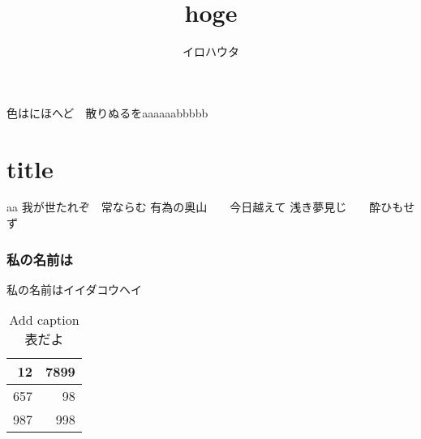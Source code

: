 \documentclass{ujarticle}
\title{hoge}
\author{イロハウタ}
\begin{document}
\maketitle

色はにほへど　散りぬるをaaaaaabbbbb\part{title}aa
我が世たれぞ　常ならむ
有為の奥山　　今日越えて
浅き夢見じ　　酔ひもせず

\newpage
\section{私の名前は}
私の名前はイイダコウヘイ

\begin{table}[htbp]
	\centering
	\caption{Add caption表だよ}
	\begin{tabular}{rr}
		\toprule
		12    & 7899 \\
		\midrule
		657   & 98 \\
		987   & 998 \\
		\bottomrule
	\end{tabular}%
	\label{tab:addlabel}%
\end{table}%
\end{document}
